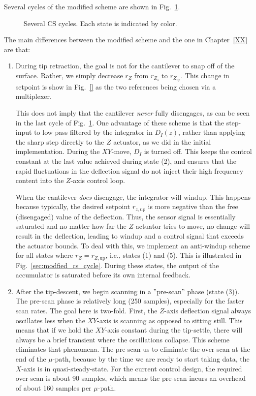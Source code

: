 \documentclass[11pt]{article}
\begin{document}
Several cycles of the modified scheme are shown in Fig.~\ref{fig:cs_cycle_final}.
\begin{figure}
  \centering
  
  \caption{Several CS cycles. Each state is indicated by color.}
  \label{fig:cs_cycle_final}
\end{figure}
The main differences between the modified scheme and the one in Chapter~\ref{XX} are that:
\begin{enumerate}
\item{
    During tip retraction, the goal is not for the cantilever to snap off of the surface. Rather, we simply decrease $r_Z$ from $r_{Z_s}$ to $r_{Z_{up}}$. This change in setpoint is show in Fig.~\ref{} as the two references being chosen via a multiplexer.
  
  This does not imply that the cantilever \emph{never} fully disengages, as can be seen in the last cycle of Fig.~\ref{fig:cs_cycle_final}. One advantage of these scheme is that the step-input to low pass filtered by the integrator in $D_I(z)$, rather than applying the sharp step directly to the $Z$ actuator, as we did in the initial implementation. During the $XY$-move, $D_I$ is turned off. This keeps the control constant at the last value achieved during state (2), and ensures that the rapid fluctuations in the deflection signal do not inject their high frequency content into the $Z$-axis control loop.

When the cantilever \emph{does} disengage, the integrator will windup. This happens because typically, the desired setpoint $r_{z,\textrm{up}}$ is more negative than the free (disengaged) value of the deflection. Thus, the sensor signal is essentially saturated and no matter how far the $Z$-actuator tries to move, no change will result in the deflection, leading to windup and a control signal that exceeds the actuator bounds. To deal with this, we implement an anti-windup scheme for all states where $r_Z=r_{Z,\textrm{up}}$, i.e., states (1) and (5). This is illustrated in Fig.~\ref{sec:modfied_cs_cycle}. During these states, the output of the accumulator is saturated before its own internal feedback. 
  }
\item{
    After the tip-descent, we begin scanning in a ''pre-scan'' phase (state (3)). The pre-scan phase is relatively long (250 samples), especially for the faster scan rates. The goal here is two-fold. First, the $Z$-axis deflection signal always oscillates less when the $XY$-axis is scanning as opposed to sitting still. This means that if we hold the $XY$-axis constant during the tip-settle, there will always be a brief transient where the oscillations collapse. This scheme eliminates that phenomena. The pre-scan us to eliminate the over-scan at the end of the $\mu$-path, because by the time we are ready to start taking data, the $X$-axis is in quasi-steady-state. For the current control design, the required over-scan is about 90 samples, which means the pre-scan incurs an overhead of about 160 samples per $\mu$-path.

}
\end{enumerate}
\end{document}
